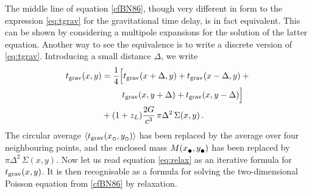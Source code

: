 The middle line of equation \eqref{cfBN86}, though very different in
form to the expression \eqref{eq:tgrav} for the gravitational time
delay, is in fact equivalent.  This can be shown by considering a
multipole expansions for the solution of the latter equation.  Another
way to see the equivalence is to write a discrete version of
\eqref{eq:tgrav}.  Introducing a small distance $\Delta$, we write
\begin{equation} \label{eq:relax}
\begin{aligned}
t_{\rm grav}(x,y) &=
\frac14 \Big[ t_{\rm grav}(x+\Delta,y) + t_{\rm grav}(x-\Delta,y) + {}\\
&\kern24pt    t_{\rm grav}(x,y+\Delta) + t_{\rm grav}(x,y-\Delta) \Big] \\
&+ (1+z_L)\frac{2G}{c^3} \, \pi\Delta^2 \, \Sigma(x,y) \,.
\end{aligned}
\end{equation}
The circular average
$\left\langle \tgrav(x_\subcirc,y_\subcirc) \right\rangle$ has
been replaced by the average over four neighbouring points, and the
enclosed mass $M(x_\subbullet,y_\subbullet)$ has been replaced by
$\pi\Delta^2\,\Sigma(x,y)$.  Now let us read equation \eqref{eq:relax}
as an iterative formula for $t_{\rm grav}(x,y)$.  It is then
recognisable as a formula for solving the two-dimensional Poisson
equation from \eqref{cfBN86} by relaxation.

\newpage

